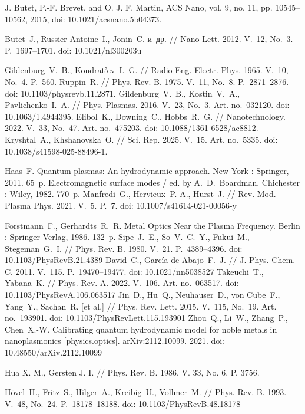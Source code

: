 \documentclass[12pt, a4paper]{article}
\begin{document}
\begin{thebibliography}{99}
J. Butet, P.-F. Brevet, and O. J. F. Martin, {ACS Nano}, vol. 9, no. 11, pp. 10545–10562, 2015, doi: 10.1021/acsnano.5b04373.

Butet~J., Russier-Antoine~I., Jonin~C. и~др. // Nano Lett. 2012. V.~12, No.~3. P.~1697--1701. doi: 10.1021/nl300203u

Gildenburg~V.~B., Kondrat’ev~I.~G. // Radio Eng. Electr. Phys. 1965. V.~10, No.~4. P.~560.
Ruppin~R. // Phys. Rev. B. 1975. V.~11, No.~8. P.~2871--2876. doi: 10.1103/physrevb.11.2871.
Gildenburg~V.~B., Kostin~V.~A., Pavlichenko~I.~A. // Phys. Plasmas. 2016. V.~23, No.~3. Art. no.~032120. doi: 10.1063/1.4944395.
Elibol~K., Downing~C., Hobbs~R.~G. // Nanotechnology. 2022. V.~33, No.~47. Art. no.~475203. doi: 10.1088/1361-6528/ac8812.
Kryshtal~A., Khshanovska~O. // Sci. Rep. 2025. V.~15. Art. no.~5335. doi: 10.1038/s41598-025-88496-1.

Haas~F. Quantum plasmas: An hydrodynamic approach. New York : Springer, 2011. 65~p.
Electromagnetic surface modes / ed. by A.~D.~Boardman. Chichester : Wiley, 1982. 770~p.
Manfredi~G., Hervieux~P.-A., Hurst~J. // Rev. Mod. Plasma Phys. 2021. V.~5. P.~7. 
doi: 10.1007/s41614-021-00056-y


Forstmann~F., Gerhardts~R.~R. Metal Optics Near the Plasma Frequency. Berlin : Springer-Verlag, 1986. 132~p.
Sipe~J.~E., So~V.~C.~Y., Fukui~M., Stegeman~G.~I. // Phys. Rev. B. 1980. V.~21. P.~4389--4396. doi: 10.1103/PhysRevB.21.4389
David~C., Garc\'{i}a de Abajo~F.~J. // J. Phys. Chem. C. 2011. V.~115. P.~19470--19477. doi: 10.1021/nn5038527
Takeuchi~T., Yabana~K. // Phys. Rev. A. 2022. V.~106. Art. no.~063517. doi: 10.1103/PhysRevA.106.063517
Jin~D., Hu~Q., Neuhauser~D., von Cube~F., Yang~Y., Sachan~R. [et al.] // Phys. Rev. Lett. 2015. V.~115, No.~19. Art. no.~193901. doi: 10.1103/PhysRevLett.115.193901
Zhou~Q., Li~W., Zhang~P., Chen~X.-W. Calibrating quantum hydrodynamic model for noble metals in nanoplasmonics [physics.optics]. arXiv:2112.10099. 2021. doi: 10.48550/arXiv.2112.10099

Hua X. M., Gersten J. I. // Phys. Rev. B. 1986. V. 33, No. 6. P. 3756.

H\"{o}vel~H., Fritz~S., Hilger~A., Kreibig~U., Vollmer~M. // Phys. Rev. B. 1993. V.~48, No.~24. P.~18178--18188. doi: 10.1103/PhysRevB.48.18178

\end{thebibliography}
\end{document}
